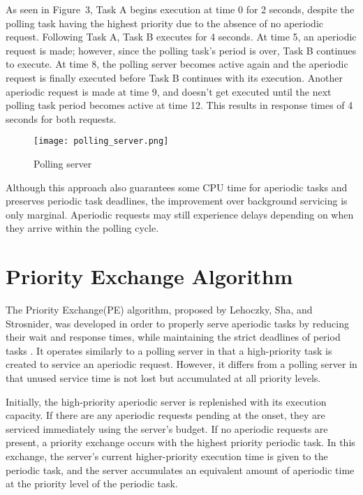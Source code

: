 \documentclass[conference]{IEEEtran}
\begin{document}
As seen in Figure~3, Task A begins execution at time 0 for 2 seconds, despite the polling task having the highest priority due to the absence of no aperiodic request. Following Task A, Task B executes for 4 seconds. At time 5, an aperiodic request is made; however, since the polling task's period is over, Task B continues to execute. At time 8, the polling server becomes active again and the aperiodic request is finally executed before Task B continues with its execution. Another aperiodic request is made at time 9, and doesn't get executed until the next polling task period becomes active at time 12. This results in response times of 4 seconds for both requests.

\begin{figure*}[!t]
  \centering
  \texttt{[image: polling\_server.png]}
  \caption{Polling server}
  \label{fig:polling_server}
\end{figure*}

Although this approach also guarantees some CPU time for aperiodic tasks and preserves periodic task deadlines, the improvement over background servicing is only marginal. Aperiodic requests may still experience delays depending on when they arrive within the polling cycle.




\section{Priority Exchange Algorithm}
The Priority Exchange(PE) algorithm, proposed by Lehoczky, Sha, and Strosnider, was developed in order to properly serve aperiodic tasks by reducing their wait and response times, while maintaining the strict deadlines of period tasks \cite{lehoczky1987enhanced}. It operates similarly to a polling server in that a high-priority task is created to service an aperiodic request. However, it differs from a polling server in that unused service time is not lost but accumulated at all priority levels. 
 
Initially, the high-priority aperiodic server is replenished with its execution capacity. If there are any aperiodic requests pending at the onset, they are serviced immediately using the server's budget. If no aperiodic requests are present, a priority exchange occurs with the highest priority periodic task. In this exchange, the server's current higher-priority execution time is given to the periodic task, and the server accumulates an equivalent amount of aperiodic time at the priority level of the periodic task. 
\end{document}
